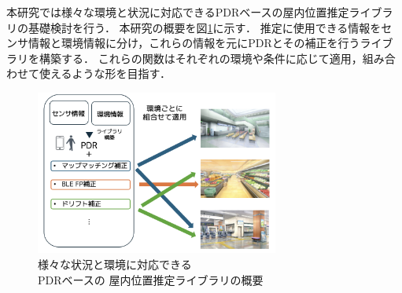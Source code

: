 本研究では様々な環境と状況に対応できるPDRベースの屋内位置推定ライブラリの基礎検討を行う．
本研究の概要を図\ref{fig:overview}に示す．
推定に使用できる情報をセンサ情報と環境情報に分け，これらの情報を元にPDRとその補正を行うライブラリを構築する．
これらの関数はそれぞれの環境や条件に応じて適用，組み合わせて使えるような形を目指す．

\begin{figure}[h]
	\centering
	\includegraphics[width=80mm]{image/first.png}
	\caption{様々な状況と環境に対応できる\\PDRベースの
		屋内位置推定ライブラリの概要}    \label{fig:overview}
\end{figure}


